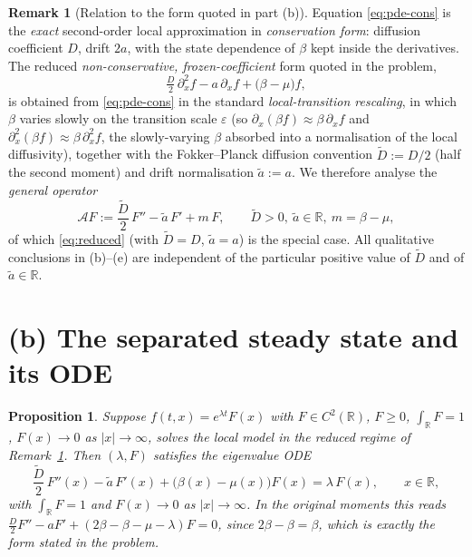 \documentclass{amsart}
\newtheorem{proposition}{Proposition}
\theoremstyle{definition}
\newtheorem{remark}{Remark}
\newcommand{\R}{\mathbb{R}}
\begin{document}
\begin{remark}[Relation to the form quoted in part (b)]\label{rem:form}
Equation \eqref{eq:pde-cons} is the \emph{exact} second-order local approximation in
\emph{conservation form}: diffusion coefficient $D$, drift $2a$, with the state dependence
of $\beta$ kept inside the derivatives. The reduced \emph{non-conservative,
frozen-coefficient} form quoted in the problem,
\begin{equation}\label{eq:reduced}
\tfrac{D}{2}\,\partial_x^2 f - a\,\partial_x f + \bigl(\beta-\mu\bigr) f,
\end{equation}
is obtained from \eqref{eq:pde-cons} in the standard \emph{local-transition rescaling}, in
which $\beta$ varies slowly on the transition scale $\varepsilon$ (so
$\partial_x(\beta f)\approx \beta\,\partial_x f$ and $\partial_x^2(\beta f)\approx
\beta\,\partial_x^2 f$, the slowly-varying $\beta$ absorbed into a normalisation of the local
diffusivity), together with the Fokker--Planck diffusion convention $\widetilde D:=D/2$ (half
the second moment) and drift normalisation $\widetilde a:=a$. We therefore analyse the
\emph{general operator}
\begin{equation}\label{eq:Ldef}
\mathcal{A}F := \frac{\widetilde D}{2}\,F'' - \widetilde a\,F' + m\,F,
\qquad \widetilde D>0,\ \widetilde a\in\R,\ m=\beta-\mu,
\end{equation}
of which \eqref{eq:reduced} (with $\widetilde D=D$, $\widetilde a=a$) is the special case.
All qualitative conclusions in (b)--(e) are independent of the particular positive value of
$\widetilde D$ and of $\widetilde a\in\R$.
\end{remark}

\section{(b) The separated steady state and its ODE}

\begin{proposition}\label{prop:ode}
Suppose $f(t,x)=e^{\lambda t}F(x)$ with $F\in C^2(\R)$, $F\ge0$, $\int_\R F=1$,
$F(x)\to0$ as $|x|\to\infty$, solves the local model in the reduced regime of
Remark~\ref{rem:form}. Then $(\lambda,F)$ satisfies the eigenvalue ODE
\begin{equation}\label{eq:ode}
\frac{\widetilde D}{2}\,F''(x) - \widetilde a\,F'(x) + \bigl(\beta(x)-\mu(x)\bigr)F(x) = \lambda\,F(x),
\qquad x\in\R,
\end{equation}
with $\int_\R F=1$ and $F(x)\to0$ as $|x|\to\infty$. In the original moments this reads
$\frac{D}{2}F'' - aF' + (2\beta-\beta-\mu-\lambda)F=0$, since $2\beta-\beta=\beta$, which is
exactly the form stated in the problem.
\end{proposition}
\end{document}
